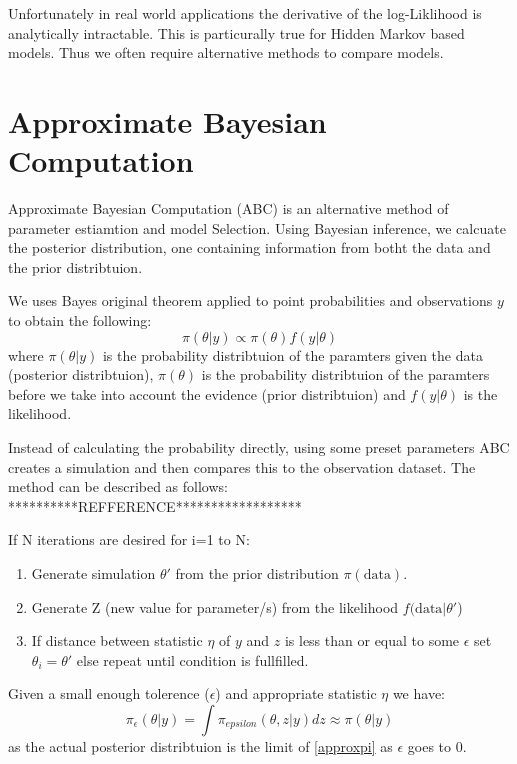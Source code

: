 Unfortunately in real world applications the derivative of the log-Liklihood is analytically intractable. This is particurally true for Hidden Markov based models. Thus we often require alternative methods to compare models.


\section{Approximate Bayesian Computation}

Approximate Bayesian Computation (ABC) is an alternative method of parameter estiamtion and model Selection. Using Bayesian inference, we calcuate the posterior distribution, one containing information from botht the data and the prior distribtuion. 

We uses Bayes original theorem applied to point probabilities and observations $y$ to obtain the following:
\begin{equation}
    \pi(\theta | y) \propto \pi(\theta) f(y|\theta)
\end{equation} 
where $\pi(\theta | y)$ is the probability distribtuion of the paramters given the data (posterior distribtuion), $\pi(\theta)$ is the probability distribtuion of the paramters before we take into account the evidence (prior distribtuion) and $f(y|\theta)$ is the likelihood.

Instead of calculating the probability directly, using some preset parameters ABC creates a simulation and then compares this to the observation dataset. The method can be described as follows:
**********REFFERENCE******************

If N iterations are desired for i=1 to N:
\begin{enumerate}
    \item Generate simulation $\theta '$ from the prior distribution $\pi(\text{data})$.
    \item Generate Z (new value for parameter/s) from the likelihood $f(\text{data}|\theta '$)
    \item If distance between statistic $\eta$ of $y$ and $z$ is less than or equal to some $\epsilon$ set $\theta_i = \theta'$ else repeat until condition is fullfilled.
\end{enumerate}

Given a small enough tolerence ($\epsilon$) and appropriate statistic $\eta$ we have:
\begin{equation}
    \label{approxpi}
    \pi_{\epsilon}(\theta|y) = \int \pi_{epsilon}(\theta, z|y)dz \approx \pi(\theta|y)
\end{equation}
as the actual posterior distribtuion is the limit of \ref{approxpi} as $\epsilon$ goes to 0.